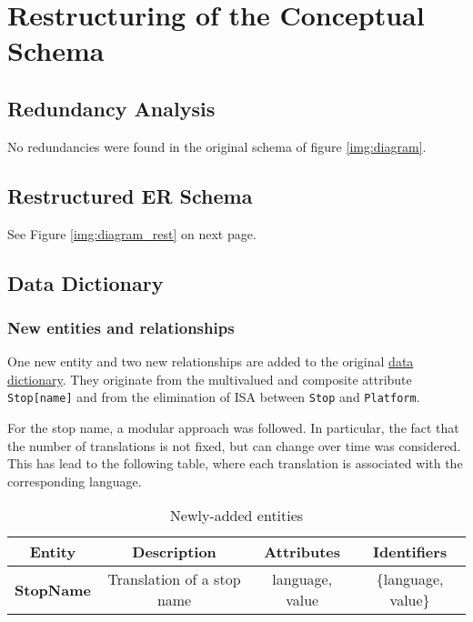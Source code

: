 \section{Restructuring of the Conceptual Schema} 

\subsection{Redundancy Analysis}

No redundancies were found in the original schema of figure \ref{img:diagram}.

\subsection{Restructured ER Schema}

See Figure \ref{img:diagram_rest} on next page.

\subsection{Data Dictionary}

\subsubsection{New entities and relationships}
\label{sec:dictionary-rest}

 One new entity and two new relationships are added to the original \hyperref[sec:dictionary]{data dictionary}. They originate from the multivalued and composite attribute \texttt{Stop[name]} and from the elimination of ISA between \texttt{Stop} and \texttt{Platform}.
 
 For the stop name, a modular approach was followed. In particular, the fact that the number of translations is not fixed, but can change over time was considered. This has lead to the following table, where each translation is associated with the corresponding language.

\begin{table}[htp]
	\centering
	\begin{tabularx}{\columnwidth}{|c|C|c|c|}
		\hline
		\textbf{Entity} & \textbf{Description} & \textbf{Attributes} & \textbf{Identifiers} \\
		\hline
		\textbf{StopName} & Translation of a stop name & language, value & \{language, value\} \\
		\hline
	\end{tabularx}
	\caption{Newly-added entities}\label{tbl:entites-rest}
\end{table} 

